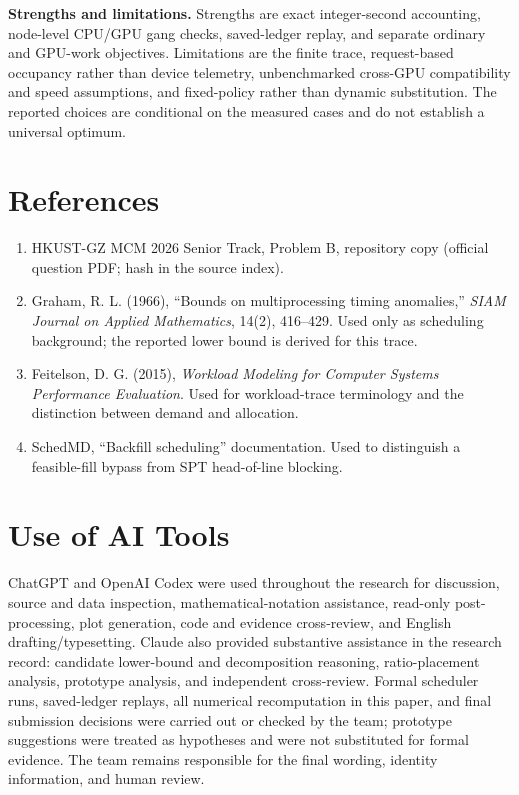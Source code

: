 \textbf{Strengths and limitations.} Strengths are exact integer-second accounting, node-level CPU/GPU gang checks, saved-ledger replay, and separate ordinary and GPU-work objectives. Limitations are the finite trace, request-based occupancy rather than device telemetry, unbenchmarked cross-GPU compatibility and speed assumptions, and fixed-policy rather than dynamic substitution. The reported choices are conditional on the measured cases and do not establish a universal optimum.

\section*{References}
\begin{enumerate}
\item HKUST-GZ MCM 2026 Senior Track, Problem B, repository copy (official question PDF; hash in the source index).
\item Graham, R. L. (1966), ``Bounds on multiprocessing timing anomalies,'' \emph{SIAM Journal on Applied Mathematics}, 14(2), 416--429. Used only as scheduling background; the reported lower bound is derived for this trace.
\item Feitelson, D. G. (2015), \emph{Workload Modeling for Computer Systems Performance Evaluation}. Used for workload-trace terminology and the distinction between demand and allocation.
\item SchedMD, ``Backfill scheduling'' documentation. Used to distinguish a feasible-fill bypass from SPT head-of-line blocking.
\end{enumerate}

\section*{Use of AI Tools}
ChatGPT and OpenAI Codex were used throughout the research for discussion, source and data inspection, mathematical-notation assistance, read-only post-processing, plot generation, code and evidence cross-review, and English drafting/typesetting. Claude also provided substantive assistance in the research record: candidate lower-bound and decomposition reasoning, ratio-placement analysis, prototype analysis, and independent cross-review. Formal scheduler runs, saved-ledger replays, all numerical recomputation in this paper, and final submission decisions were carried out or checked by the team; prototype suggestions were treated as hypotheses and were not substituted for formal evidence. The team remains responsible for the final wording, identity information, and human review.

